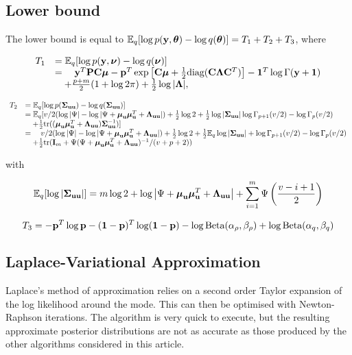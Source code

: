 \documentclass{article}[12pt]
\begin{document}
\subsection{Lower bound}
\noindent The lower bound is equal to
${\mathbb E}_q[\log{p({\bf y}, {\boldsymbol\theta})} - \log{q({\boldsymbol\theta})}] = T_1 + T_2 + T_3$,
where

$$
\begin{array}{rl}
T_1 &= {\mathbb E}_q[\log{p({\bf y}, {\boldsymbol\nu})} - \log{q({\boldsymbol\nu})}] \\
&= \quad {\bf y}^T {\bf P} {\bf C} {\boldsymbol \mu} - {\bf p}^T \exp{\left [{\bf C}{\boldsymbol\mu}+ {\frac{1}{2}}\text{diag} ({\bf C}{\boldsymbol\Lambda}{\bf C}^T)\right ]} - {\bf 1}^T\log \Gamma{({\bf y}+ {\bf1})}\\
& \quad + \frac{p + m}{2} (1 + \log{2 \pi}) + {\frac{1}{2}} \log{|{\boldsymbol\Lambda}|},
\end{array}
$$


$$
\begin{array}{rl}
T_2 &= {\mathbb E}_q [\log p({\boldsymbol \Sigma}_{{\bf u} {\bf u}}) - \log q({\boldsymbol \Sigma}_{{\bf u} {\bf u}})] \\
&= {\mathbb E}_q [v/2(\log |\Psi| - \log |\Psi + {\boldsymbol \mu}_{\bf u} {\boldsymbol \mu}_{\bf u}^T + {\boldsymbol \Lambda}_{{\bf u} {\bf u}}|) + {\frac{1}{2}} \log 2 + {\frac{1}{2}} \log|{\boldsymbol \Sigma}_{{\bf u} {\bf u}}| \log \Gamma_{p+1}(v/2) - \log \Gamma_{p}(v/2)\\
&\quad + {\frac{1}{2}} \text{tr}(({\boldsymbol \mu}_{{\bf u}} {\boldsymbol \mu}_{{\bf u}}^T + {\boldsymbol \Lambda}_{{\bf u} {\bf u}}) {\boldsymbol \Sigma}_{{\bf u} {\bf u}}^{-1}) ] \\
&= \quad v/2(\log |\Psi| - \log |\Psi + {\boldsymbol \mu}_{\bf u} {\boldsymbol \mu}_{\bf u}^T + {\boldsymbol \Lambda}_{{\bf u} {\bf u}}|) + {\frac{1}{2}} \log 2 + {\frac{1}{2}} {\mathbb E}_q \log |{\boldsymbol \Sigma}_{{\bf u} {\bf u}}| + \log \Gamma_{p+1}(v/2) - \log \Gamma_{p}(v/2) \\
&\quad + {\frac{1}{2}} \text{tr}({\bf I}_m + \Psi(\Psi+ {\boldsymbol \mu}_{\bf u} {\boldsymbol \mu}_{\bf u}^T + {\boldsymbol \Lambda}_{{\bf u} {\bf u}})^{-1}/(v + p + 2))
\end{array}
$$

with

$$
{\mathbb E}_q [\log |{\boldsymbol \Sigma}_{{\bf u} {\bf u}}|] = m \log 2 + \log \left | \Psi + {\boldsymbol \mu}_{\bf u} {\boldsymbol \mu}_{\bf u}^T + {\boldsymbol \Lambda}_{{\bf u} {\bf u}} \right | + \sum_{i=1}^m \Psi \left ( \frac{v - i + 1}{2} \right )
$$

$$T_3 = - {\bf p}^T \log {\bf p} - ({\bf 1} - {\bf p})^T \log ({\bf 1} - {\bf p}) - \log \text{Beta} (\alpha_\rho, \beta_\rho) + \log \text{Beta} (\alpha_q, \beta_q)$$

\subsection{Laplace-Variational Approximation}
Laplace's method of approximation relies on a second order Taylor expansion of the
log likelihood around the mode. This can then be optimised with Newton-Raphson
iterations. The algorithm is very quick to execute, but the resulting approximate
posterior distributions are not as accurate as those produced by the other algorithms
considered in this article.
\end{document}
